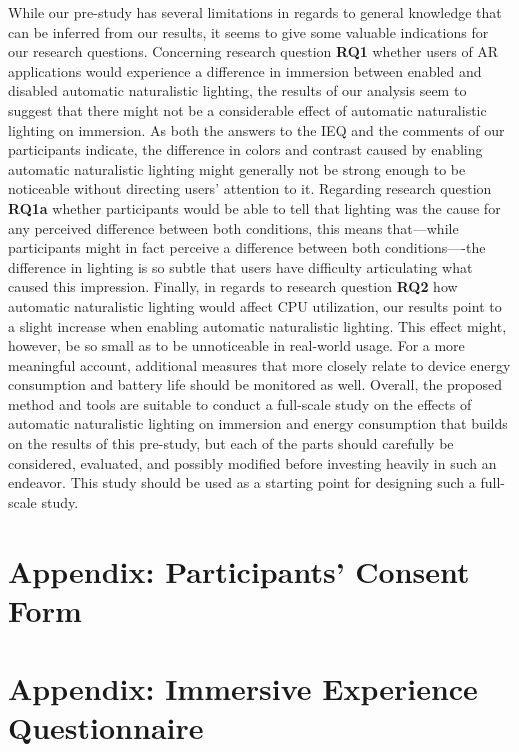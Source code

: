 \documentclass[12pt,twoside,english]{article}
\begin{document}
While our pre-study has several limitations in regards to general knowledge that can be inferred from our results, it seems to give some valuable indications for our research questions.
Concerning research question \textbf{RQ1} whether users of \gls{AR} applications would experience a difference in immersion between enabled and disabled automatic naturalistic lighting, the results of our analysis seem to suggest that there might not be a considerable effect of automatic naturalistic lighting on immersion.
As both the answers to the \gls{IEQ} and the comments of our participants indicate, the difference in colors and contrast caused by enabling automatic naturalistic lighting might generally not be strong enough to be noticeable without directing users' attention to it.
Regarding research question \textbf{RQ1a} whether participants would be able to tell that lighting was the cause for any perceived difference between both conditions, this means that---while participants might in fact perceive a difference between both conditions----the difference in lighting is so subtle that users have difficulty articulating what caused this impression.
Finally, in regards to research question \textbf{RQ2} how automatic naturalistic lighting would affect \gls{CPU} utilization, our results point to a slight increase when enabling automatic naturalistic lighting.
This effect might, however, be so small as to be unnoticeable in real-world usage.
For a more meaningful account, additional measures that more closely relate to device energy consumption and battery life should be monitored as well.
Overall, the proposed method and tools are suitable to conduct a full-scale study on the effects of automatic naturalistic lighting on immersion and energy consumption that builds on the results of this pre-study, but each of the parts should carefully be considered, evaluated, and possibly modified before investing heavily in such an endeavor.
This study should be used as a starting point for designing such a full-scale study.



% 


\appendix
\section{Appendix: Participants' Consent Form}
\label{sect:appendix}
\label{sect:consent-form}


\section{Appendix: Immersive Experience Questionnaire}
\label{sect:ieq}


\clearpage
\end{document}
